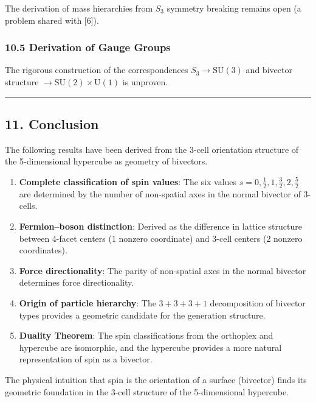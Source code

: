 \documentclass[a4paper,11pt]{article}
\providecommand{\tightlist}{\setlength{\itemsep}{0pt}\setlength{\parskip}{0pt}}
\begin{document}
The derivation of mass hierarchies from $S_3$ symmetry breaking remains open (a problem shared with [6]).

\subsubsection*{10.5 Derivation of Gauge Groups}

The rigorous construction of the correspondences $S_3 \to \mathrm{SU}(3)$ and bivector structure $\to \mathrm{SU}(2) \times \mathrm{U}(1)$ is unproven.

\begin{center}\rule{0.5\linewidth}{0.5pt}\end{center}

\subsection*{11. Conclusion}

The following results have been derived from the 3-cell orientation structure of the 5-dimensional hypercube as geometry of bivectors.

\begin{enumerate}
\def\labelenumi{\arabic{enumi}.}
\tightlist
\item
  \textbf{Complete classification of spin values}: The six values
  $s = 0, \frac{1}{2}, 1, \frac{3}{2}, 2, \frac{5}{2}$
  are determined by the number of non-spatial axes in the normal bivector of 3-cells.
\item
  \textbf{Fermion--boson distinction}: Derived as the difference in lattice structure between 4-facet centers (1 nonzero coordinate) and 3-cell centers (2 nonzero coordinates).
\item
  \textbf{Force directionality}: The parity of non-spatial axes in the normal bivector determines force directionality.
\item
  \textbf{Origin of particle hierarchy}: The $3 + 3 + 3 + 1$ decomposition of bivector types provides a geometric candidate for the generation structure.
\item
  \textbf{Duality Theorem}: The spin classifications from the orthoplex and hypercube are isomorphic, and the hypercube provides a more natural representation of spin as a bivector.
\end{enumerate}

The physical intuition that spin is the orientation of a surface (bivector) finds its geometric foundation in the 3-cell structure of the 5-dimensional hypercube.
\end{document}

